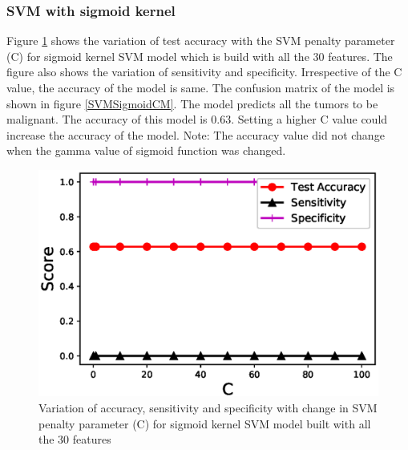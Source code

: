\documentclass[twoside]{iitbreport}
\begin{document}
\subsubsection{SVM with sigmoid kernel}
Figure \ref{SVMSigmoid} shows the variation of test accuracy with the SVM penalty parameter (C) for sigmoid kernel SVM model which is build with all the 30 features. The figure also shows the variation of sensitivity and specificity. Irrespective of the C value, the accuracy of the model is same. The confusion matrix of the model is shown in figure \ref{SVMSigmoidCM}. The model predicts all the tumors to be malignant. The accuracy of this model is 0.63. Setting a higher C value could increase the accuracy of the model. Note: The accuracy value did not change when the gamma value of sigmoid function was changed.  
\begin{figure}[]
  \begin{center}
    \includegraphics[trim={0cm 0cm 0cm 0cm},clip,scale=1]{Figures/SVM_Sigmoid_Accuracy}
  \end{center}
  \caption{Variation of accuracy, sensitivity and specificity with change in SVM penalty parameter (C) for sigmoid kernel SVM model built with all the 30 features}
  \label{SVMSigmoid}
\end{figure}
\end{document}
